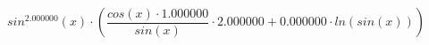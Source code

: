 \documentclass{article}
\begin{document}
$$sin^{2.000000}(x) \cdot (\frac{cos(x) \cdot 1.000000}{sin(x)} \cdot 2.000000 + 0.000000 \cdot ln(sin(x)))$$
\end{document}

